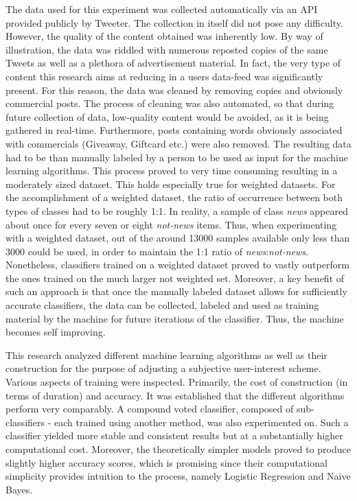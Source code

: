 	\par
	The data used for this experiment was collected automatically via an API provided publicly by Tweeter. The collection in itself did not pose any difficulty. However, the quality of the content obtained was inherently low. By way of illustration, the data was riddled with numerous reposted copies of the same Tweets as well as a plethora of advertisement material. In fact, the very type of content this research aims at reducing in a users data-feed was significantly present. For this reason, the data was cleaned by removing copies and obviously commercial posts. The process of cleaning was also automated, so that during future collection of data, low-quality content would be avoided, as it is being gathered in real-time. Furthermore, posts containing words obviously associated with commercials (Giveaway, Giftcard etc.) were also removed. The resulting data had to be than manually labeled by a person to be used as input for the machine learning algorithms. This process proved to very time consuming resulting in a moderately sized dataset. This holds especially true for weighted datasets. For the accomplishment of a weighted dataset, the ratio of occurrence between both types of classes had to be roughly 1:1. In reality, a sample of class \textit{news} appeared about once for every seven or eight \textit{not-news} items. Thus, when experimenting with a weighted dataset, out of the around 13000 samples available only less than 3000 could be used, in order to maintain the 1:1 ratio of \textit{news}:\textit{not-news}. Nonetheless, classifiers trained on a weighted dataset proved to vastly outperform the ones trained on the much larger not weighted set. Moreover, a key benefit of such an approach is that once the manually labeled dataset allows for sufficiently accurate classifiers, the data can be collected, labeled and used as training material by the machine for future iterations of the classifier. Thus, the machine becomes self improving.
	
	\par
	
	This research analyzed different machine learning algorithms as well as their construction for the purpose of adjusting a subjective user-interest scheme. Various aspects of training were inspected. Primarily, the cost of construction (in terms of duration) and accuracy. It was established that the different algorithms perform very comparably. A compound voted classifier, composed of sub-classifiers - each trained using another method, was also experimented on. Such a classifier yielded more stable and consistent results but at a substantially higher computational cost. Moreover, the theoretically simpler models proved to produce slightly higher accuracy scores, which is promising since their computational simplicity provides intuition to the process, namely Logistic Regression and Naive Bayes.
	
